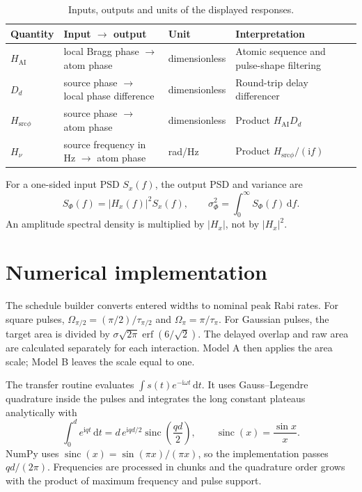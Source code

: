 \documentclass[11pt,a4paper]{article}
\newcommand{\dd}{\,\mathrm{d}}
\newcommand{\ii}{\mathrm{i}}
\newcommand{\Hatom}{H_{\mathrm{AI}}}
\newcommand{\Hsrc}{H_{\mathrm{src}\phi}}
\newcommand{\Hnu}{H_{\nu}}
\begin{document}
\begin{table}[H]
\centering
\caption{Inputs, outputs and units of the displayed responses.}
\begin{tabularx}{\textwidth}{@{}lllX@{}}
\toprule
Quantity & Input $\rightarrow$ output & Unit & Interpretation \\
\midrule
$\Hatom$ & local Bragg phase $\rightarrow$ atom phase & dimensionless & Atomic sequence and pulse-shape filtering \\
$D_d$ & source phase $\rightarrow$ local phase difference & dimensionless & Round-trip delay differencer \\
$\Hsrc$ & source phase $\rightarrow$ atom phase & dimensionless & Product $\Hatom D_d$ \\
$\Hnu$ & source frequency in Hz $\rightarrow$ atom phase & rad/Hz & Product $\Hsrc/(\ii f)$ \\
\bottomrule
\end{tabularx}
\end{table}

For a one-sided input PSD $S_x(f)$, the output PSD and variance are
\begin{equation}
 S_{\Phi}(f)=|H_x(f)|^2S_x(f),
 \qquad
 \sigma_\Phi^2=\int_0^\infty S_\Phi(f)\dd f.
\end{equation}
An amplitude spectral density is multiplied by $|H_x|$, not by $|H_x|^2$.

\section{Numerical implementation}

The schedule builder converts entered widths to nominal peak Rabi rates. For square pulses, $\Omega_{\pi/2}=(\pi/2)/\tau_{\pi/2}$ and $\Omega_\pi=\pi/\tau_\pi$. For Gaussian pulses, the target area is divided by $\sigma\sqrt{2\pi}\operatorname{erf}(6/\sqrt{2})$. The delayed overlap and raw area are calculated separately for each interaction. Model A then applies the area scale; Model B leaves the scale equal to one.

The transfer routine evaluates $\int s(t)e^{-\ii\omega t}\dd t$. It uses Gauss--Legendre quadrature inside the pulses and integrates the long constant plateaus analytically with
\begin{equation}
 \int_0^d e^{\ii qt}\dd t
 =d\,e^{\ii qd/2}\operatorname{sinc}\!\left(\frac{qd}{2}\right),
 \qquad \operatorname{sinc}(x)=\frac{\sin x}{x}.
\end{equation}
NumPy uses $\operatorname{sinc}(x)=\sin(\pi x)/(\pi x)$, so the implementation passes $qd/(2\pi)$. Frequencies are processed in chunks and the quadrature order grows with the product of maximum frequency and pulse support.
\end{document}
